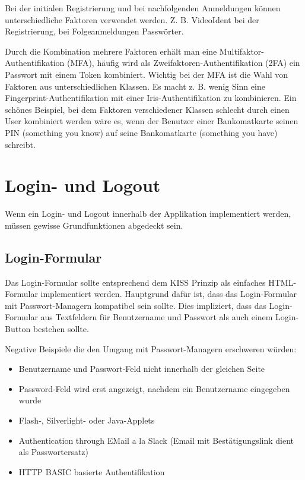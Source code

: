 Bei der initialen Registrierung und bei nachfolgenden Anmeldungen können unterschiedliche Faktoren verwendet werden. Z. B. VideoIdent bei der Registrierung, bei Folgeanmeldungen Passwörter.

Durch die Kombination mehrere Faktoren erhält man eine Multifaktor-Authentifikation (MFA), häufig wird als Zweifaktoren-Authentifikation (2FA) ein Passwort mit einem Token kombiniert. Wichtig bei der MFA ist die Wahl von Faktoren aus unterschiedlichen Klassen. Es macht z. B. wenig Sinn eine Fingerprint-Authentifikation mit einer Iris-Authentifikation zu kombinieren. Ein schönes Beispiel, bei dem Faktoren verschiedener Klassen schlecht durch einen User kombiniert werden wäre es, wenn der Benutzer einer Bankomatkarte seinen PIN (something you know) auf seine Bankomatkarte (something you have) schreibt.

\section{Login- und Logout}

Wenn ein Login- und Logout innerhalb der Applikation implementiert werden, müssen gewisse Grundfunktionen abgedeckt sein.

\subsection{Login-Formular}

Das Login-Formular sollte entsprechend dem KISS Prinzip als einfaches HTML-Formular implementiert werden. Hauptgrund dafür ist, dass das Login-Formular mit Passwort-Managern kompatibel sein sollte. Dies impliziert, dass das Login-Formular aus Textfeldern für Benutzername und Passwort als auch einem Login-Button bestehen sollte.

Negative Beispiele die den Umgang mit Passwort-Managern erschweren würden:

\begin{itemize}
	\item Benutzername und Passwort-Feld nicht innerhalb der gleichen Seite
	\item Password-Feld wird erst angezeigt, nachdem ein Benutzername eingegeben wurde
	\item Flash-, Silverlight- oder Java-Applets
	\item Authentication through EMail a la Slack (Email mit Bestätigungslink dient als Passwortersatz)
	\item HTTP BASIC basierte Authentifikation
\end{itemize}

